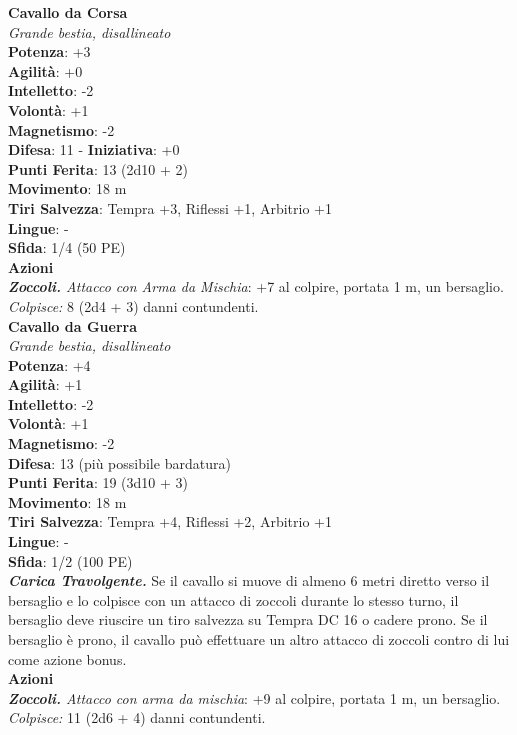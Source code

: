 \begin{multicols}{2}
\medskip\textbf{Cavallo da Corsa}\\
\emph{Grande bestia, disallineato}\\
\textbf{Potenza}: +3\\
\textbf{Agilità}: +0\\
\textbf{Intelletto}: -2\\
\textbf{Volontà}: +1\\
\textbf{Magnetismo}: -2\\
\textbf{Difesa}: 11 - \textbf{Iniziativa}: +0\\
\textbf{Punti Ferita}: 13 (2d10 + 2)\\
\textbf{Movimento}: 18 m\\
\textbf{Tiri Salvezza}: Tempra +3, Riflessi +1, Arbitrio +1 \\
\textbf{Lingue}: -\\
\textbf{Sfida}: 1/4 (50 PE)\smallskip\\
\smallskip\textbf{Azioni}\\
\emph{\textbf{Zoccoli.} Attacco con Arma da Mischia}: +7 al colpire, portata 1 m, un bersaglio.\\
\emph{Colpisce:} 8 (2d4 + 3) danni contundenti.\\

\medskip\textbf{Cavallo da Guerra}\\
\emph{Grande bestia, disallineato}\\
\textbf{Potenza}: +4\\
\textbf{Agilità}: +1\\
\textbf{Intelletto}: -2\\
\textbf{Volontà}: +1\\
\textbf{Magnetismo}: -2\\
\textbf{Difesa}: 13 (più possibile bardatura)\\
\textbf{Punti Ferita}: 19 (3d10 + 3)\\
\textbf{Movimento}: 18 m\\
\textbf{Tiri Salvezza}:  Tempra +4, Riflessi +2, Arbitrio +1 \\
\textbf{Lingue}: -\\
\textbf{Sfida}: 1/2 (100 PE)\smallskip\\
\emph{\textbf{Carica Travolgente.}} Se il cavallo si muove di almeno 6 metri diretto verso il bersaglio e lo colpisce con un attacco di zoccoli durante lo stesso turno, il bersaglio deve riuscire un tiro salvezza su Tempra DC  16 o cadere prono. Se il bersaglio è prono, il cavallo può effettuare un altro attacco di zoccoli contro di lui come azione bonus. \\
\smallskip\textbf{Azioni}\\
\emph{\textbf{Zoccoli.} Attacco con arma da mischia}: +9 al colpire, portata 1 m, un bersaglio.\\
\emph{Colpisce:} 11 (2d6 + 4) danni contundenti.\\


\end{multicols}
